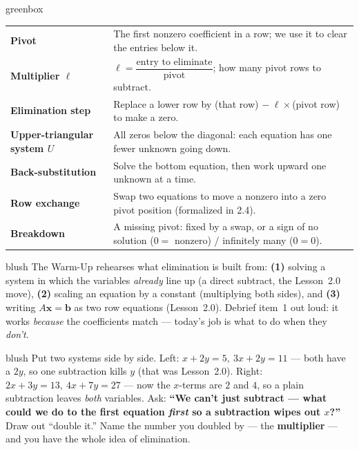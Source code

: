 \documentclass[10pt]{article}
\newcommand{\xx}{\mathbf{x}}
\newcommand{\bb}{\mathbf{b}}
\begin{document}
\begin{skillbox}{greenbox}
\renewcommand{\arraystretch}{1.3}
\begin{tabularx}{\linewidth}{@{}l X@{}}
\textbf{Pivot} & The first nonzero coefficient in a row; we use it to clear the entries below it. \\
\textbf{Multiplier $\ell$} & $\ell = \dfrac{\text{entry to eliminate}}{\text{pivot}}$; how many pivot rows to subtract. \\
\textbf{Elimination step} & Replace a lower row by (that row) $-\;\ell\times$(pivot row) to make a zero. \\
\textbf{Upper-triangular system $U$} & All zeros below the diagonal: each equation has one fewer unknown going down. \\
\textbf{Back-substitution} & Solve the bottom equation, then work upward one unknown at a time. \\
\textbf{Row exchange} & Swap two equations to move a nonzero into a zero pivot position (formalized in 2.4). \\
\textbf{Breakdown} & A missing pivot: fixed by a swap, or a sign of no solution ($0=$ nonzero) / infinitely many ($0=0$). \\
\end{tabularx}
\end{skillbox}

\begin{fixedskillbox}{blush}
    The Warm-Up rehearses what elimination is built from:
    \textbf{(1)} solving a system in which the variables \emph{already} line up (a direct subtract,
    the Lesson~2.0 move), \textbf{(2)} scaling an equation by a constant (multiplying both sides),
    and \textbf{(3)} writing $A\xx=\bb$ as two row equations (Lesson~2.0). Debrief item~1 out loud:
    it works \emph{because} the coefficients match --- today's job is what to do when they
    \emph{don't}.
\end{fixedskillbox}

\begin{skillbox}[Hook]{blush}
    Put two systems side by side. Left: $x+2y=5,\ 3x+2y=11$ --- both have a $2y$, so one
    subtraction kills $y$ (that was Lesson~2.0). Right: $2x+3y=13,\ 4x+7y=27$ --- now the
    $x$-terms are $2$ and $4$, so a plain subtraction leaves \emph{both} variables. Ask:
    \textbf{``We can't just subtract --- what could we do to the first equation \emph{first} so a
    subtraction wipes out $x$?''} Draw out ``double it.'' Name the number you doubled by --- the
    \textbf{multiplier} --- and you have the whole idea of elimination.
\end{skillbox}
\end{document}
